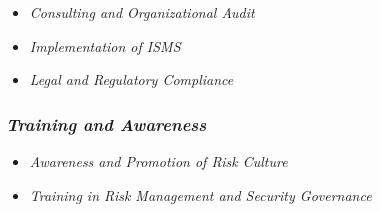 \begin{itemize}[label={$\star$}]
    \item \textit{Consulting and Organizational Audit}
    \item \textit{Implementation of ISMS}
    \item \textit{Legal and Regulatory Compliance}
\end{itemize}

\subsubsection*{\textit{Training and Awareness}}

\begin{itemize}[label={$\star$}]
    \item \textit{Awareness and Promotion of Risk Culture}
    \item \textit{Training in Risk Management and Security Governance}
\end{itemize}
